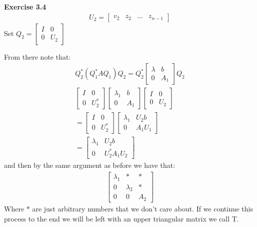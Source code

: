 \documentclass[12pt]{article}
\newenvironment{exercise}[1]{\vspace{.1in}\noindent\textbf{Exercise #1 \hspace{.05em}}}{}
\theoremstyle{definition}
\theoremstyle{remark}
\begin{document}
\begin{exercise}{3.4}
	\begin{align}
		U_2=%
		\begin{bmatrix}
			v_2 & z_2 & \dots & z_{n-1}
		\end{bmatrix}
	\end{align}
	Set $Q_2=%
		\begin{bmatrix}
			I & 0   \\
			0 & U_2
		\end{bmatrix}$

	From there note that:
	\begin{align}
		Q_2^*(Q_1^*AQ_1)Q_2=Q_2^*%
		\begin{bmatrix}
			\lambda & b   \\
			0       & A_1
		\end{bmatrix}Q_2   \\
		\begin{bmatrix}
			I & 0     \\
			0 & U_2^*
		\end{bmatrix}%
		\begin{bmatrix}
			\lambda_1 & b   \\
			0         & A_1
		\end{bmatrix}
		\begin{bmatrix}
			I & 0   \\
			0 & U_2
		\end{bmatrix}     \\
		=\begin{bmatrix}
			 I & 0     \\
			 0 & U_2^*
		 \end{bmatrix}%
		\begin{bmatrix}
			\lambda_1 & U_2b   \\
			0         & A_1U_1
		\end{bmatrix} \\
		=%
		\begin{bmatrix}
			\lambda_1 & U_2b        \\
			0         & U_2^*A_1U_2
		\end{bmatrix}
	\end{align}
	and then by the same argument as before we have that:
	\begin{align}
		\begin{bmatrix}
			\lambda_1 & *         & *   \\
			0         & \lambda_2 & *   \\
			0         & 0         & A_2
		\end{bmatrix}
	\end{align}
	Where $*$ are just arbitrary numbers that we don't care about. If we continue this process to the end we will be left with an upper triangular matrix we call T.


\end{exercise}
\end{document}

